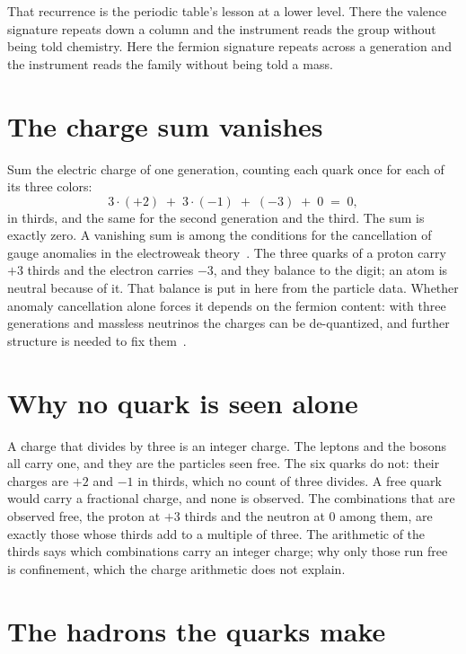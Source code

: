 That recurrence is the periodic table's lesson at a lower level. There the valence signature repeats
down a column and the instrument reads the group without being told chemistry. Here the fermion
signature repeats across a generation and the instrument reads the family without being told a mass.

\section{The charge sum vanishes}

Sum the electric charge of one generation, counting each quark once for each of its three colors:
\[
3 \cdot (+2) \;+\; 3 \cdot (-1) \;+\; (-3) \;+\; 0 \;=\; 0,
\]
in thirds, and the same for the second generation and the third. The sum is exactly zero. A vanishing
sum is among the conditions for the cancellation of gauge anomalies in the electroweak
theory~\cite{src:Bouchiat-Iliopoulos-and-Meyer-1972}. The three quarks of a proton carry $+3$ thirds
and the electron carries $-3$, and they balance to the digit; an atom is neutral because of it. That
balance is put in here from the particle data. Whether anomaly cancellation alone forces it depends on
the fermion content: with three generations and massless neutrinos the charges can be de-quantized,
and further structure is needed to fix them~\cite{src:Foot-Lew-and-Volkas-1993}.

\section{Why no quark is seen alone}

A charge that divides by three is an integer charge. The leptons and the bosons all carry one, and
they are the particles seen free. The six quarks do not: their charges are $+2$ and $-1$ in thirds,
which no count of three divides. A free quark would carry a fractional charge, and none is observed.
The combinations that are observed free, the proton at $+3$ thirds and the neutron at $0$ among them,
are exactly those whose thirds add to a multiple of three. The arithmetic of the thirds says which
combinations carry an integer charge; why only those run free is confinement, which the charge
arithmetic does not explain.

\section{The hadrons the quarks make}

